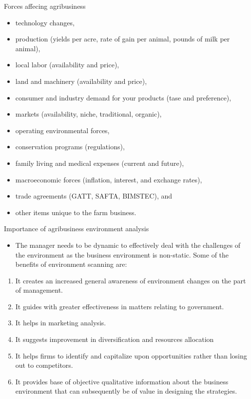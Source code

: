 \documentclass[12pt,ignorenonframetext,aspectratio=169]{beamer}
\providecommand{\tightlist}{%
  \setlength{\itemsep}{0pt}\setlength{\parskip}{0pt}}
\begin{document}
\begin{frame}{Forces affecing agribusiness}
\protect\hypertarget{forces-affecing-agribusiness}{}
\begin{itemize}
\tightlist
\item
  technology changes,
\item
  production (yields per acre, rate of gain per animal, pounds of milk
  per animal),
\item
  local labor (availability and price),
\item
  land and machinery (availability and price),
\item
  consumer and industry demand for your products (tase and preference),
\item
  markets (availability, niche, traditional, organic),
\item
  operating environmental forces,
\item
  conservation programs (regulations),
\item
  family living and medical expenses (current and future),
\item
  macroeconomic forces (inflation, interest, and exchange rates),
\item
  trade agreements (GATT, SAFTA, BIMSTEC), and
\item
  other items unique to the farm business.
\end{itemize}
\end{frame}

\begin{frame}{Importance of agribusiness environment analysis}
\protect\hypertarget{importance-of-agribusiness-environment-analysis}{}
\begin{itemize}
\tightlist
\item
  The manager needs to be dynamic to effectively deal with the
  challenges of the environment as the business environment is
  non-static. Some of the benefits of environment scanning are:
\end{itemize}

\begin{enumerate}
\tightlist
\item
  It creates an increased general awareness of environment changes on
  the part of management.
\item
  It guides with greater effectiveness in matters relating to
  government.
\item
  It helps in marketing analysis.
\item
  It suggests improvement in diversification and resources allocation
\item
  It helps firms to identify and capitalize upon opportunities rather
  than losing out to competitors.
\item
  It provides base of objective qualitative information about the
  business environment that can subsequently be of value in designing
  the strategies.
\end{enumerate}
\end{frame}
\end{document}
